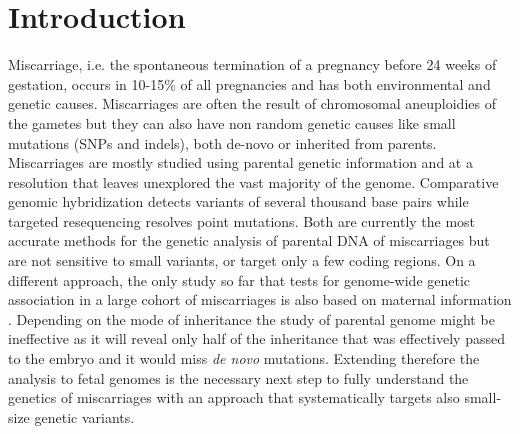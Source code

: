 \section*{Introduction}

Miscarriage, i.e. the spontaneous termination of a pregnancy before 24 weeks of gestation, occurs in  10-15\% of all pregnancies \cite{larsen2013new,ammon2012systematic, andersen2000maternal} and has both environmental and genetic causes\cite{larsen2013new}. Miscarriages are often the result of chromosomal aneuploidies of the gametes but they can also have non random genetic causes like small mutations (SNPs and indels), both de-novo or inherited from parents. Miscarriages are mostly studied using parental genetic information \cite{pereza2017systematic} and at a resolution that leaves unexplored the vast majority of the genome. Comparative genomic hybridization detects variants of several thousand base pairs \cite{robberecht2009diagnosis, kudesia2014rescue,mathur2014miscarriage} while targeted resequencing resolves point mutations. Both are currently the most accurate methods for the genetic analysis of parental DNA of miscarriages but are not sensitive to small variants, or target only a few coding regions. On a different approach, the only study so far that tests for genome-wide genetic association in a large cohort of miscarriages is also based on maternal information \cite{laisk2019genetic}. Depending on the mode of inheritance the study of parental genome might be ineffective as it will reveal only half of the inheritance that was effectively passed to the embryo and it would miss \textit{de novo} mutations. Extending therefore the analysis to fetal genomes is the necessary next step to fully understand the genetics of miscarriages with an approach that systematically targets also small-size genetic variants. 

